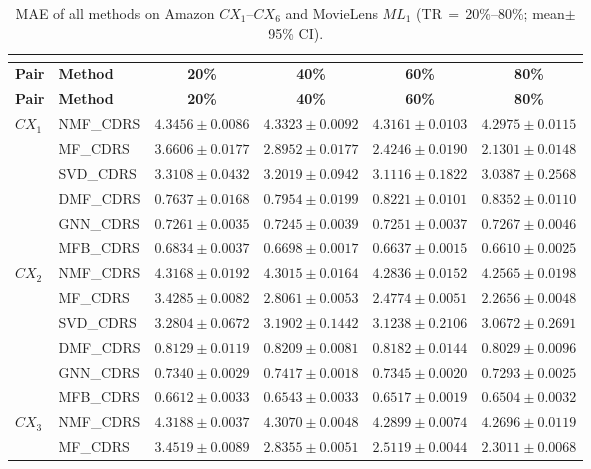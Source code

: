 \documentclass[pdflatex,sn-mathphys-num]{sn-jnl}%
\theoremstyle{thmstyleone}%
\theoremstyle{thmstyletwo}%
\theoremstyle{thmstylethree}%
\begin{document}
\begin{longtable}{llcccc}
\caption{MAE of all methods on Amazon $CX_1$--$CX_6$ and MovieLens $ML_1$ (TR\,$=$\,20\%--80\%; mean$\pm$95\% CI).}\\
\label{tab:mae_all_results}\\
\toprule
\textbf{Pair} & \textbf{Method} & \textbf{20\%} & \textbf{40\%} & \textbf{60\%} & \textbf{80\%} \\
\midrule
\endfirsthead
\toprule
\textbf{Pair} & \textbf{Method} & \textbf{20\%} & \textbf{40\%} & \textbf{60\%} & \textbf{80\%} \\
\midrule
\endhead
\bottomrule
\endfoot
\bottomrule
\endlastfoot
$CX_1$ & NMF\_CDRS & $4.3456\pm0.0086$ & $4.3323\pm0.0092$ & $4.3161\pm0.0103$ & $4.2975\pm0.0115$ \\
 & MF\_CDRS & $3.6606\pm0.0177$ & $2.8952\pm0.0177$ & $2.4246\pm0.0190$ & $2.1301\pm0.0148$ \\
 & SVD\_CDRS & $3.3108\pm0.0432$ & $3.2019\pm0.0942$ & $3.1116\pm0.1822$ & $3.0387\pm0.2568$ \\
 & DMF\_CDRS & $0.7637\pm0.0168$ & $0.7954\pm0.0199$ & $0.8221\pm0.0101$ & $0.8352\pm0.0110$ \\
 & GNN\_CDRS & $0.7261\pm0.0035$ & $0.7245\pm0.0039$ & $0.7251\pm0.0037$ & $0.7267\pm0.0046$ \\
 & MFB\_CDRS & $0.6834\pm0.0037$ & $0.6698\pm0.0017$ & $0.6637\pm0.0015$ & $0.6610\pm0.0025$ \\
\midrule
$CX_2$ & NMF\_CDRS & $4.3168\pm0.0192$ & $4.3015\pm0.0164$ & $4.2836\pm0.0152$ & $4.2565\pm0.0198$ \\
 & MF\_CDRS & $3.4285\pm0.0082$ & $2.8061\pm0.0053$ & $2.4774\pm0.0051$ & $2.2656\pm0.0048$ \\
 & SVD\_CDRS & $3.2804\pm0.0672$ & $3.1902\pm0.1442$ & $3.1238\pm0.2106$ & $3.0672\pm0.2691$ \\
 & DMF\_CDRS & $0.8129\pm0.0119$ & $0.8209\pm0.0081$ & $0.8182\pm0.0144$ & $0.8029\pm0.0096$ \\
 & GNN\_CDRS & $0.7340\pm0.0029$ & $0.7417\pm0.0018$ & $0.7345\pm0.0020$ & $0.7293\pm0.0025$ \\
 & MFB\_CDRS & $0.6612\pm0.0033$ & $0.6543\pm0.0033$ & $0.6517\pm0.0019$ & $0.6504\pm0.0032$ \\
\midrule
$CX_3$ & NMF\_CDRS & $4.3188\pm0.0037$ & $4.3070\pm0.0048$ & $4.2899\pm0.0074$ & $4.2696\pm0.0119$ \\
 & MF\_CDRS & $3.4519\pm0.0089$ & $2.8355\pm0.0051$ & $2.5119\pm0.0044$ & $2.3011\pm0.0068$ \\

\end{longtable}
\end{document}
